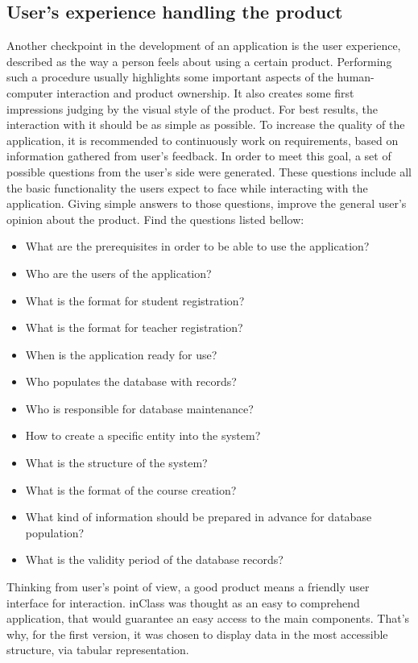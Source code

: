 \subsection{User's experience handling the product}
Another checkpoint in the development of an application is the user experience, described as the way a person feels about using a certain product. Performing such a procedure usually highlights some important aspects of the human-computer interaction and product ownership. It also creates some first impressions judging by the visual style of the product. For best results, the interaction with it should be as simple as possible. To increase the quality of the application, it is recommended to continuously  work on requirements, based on information gathered from user's feedback. In order to meet this goal, a set of possible questions from the user's side were generated. These questions include all the basic functionality the users expect to face while interacting with the application. Giving simple answers to those questions, improve the general user's opinion about the product. Find the questions listed bellow:
\begin{itemize}
\item What are the prerequisites in order to be able to use the application?
\item Who are the users of the application?
\item What is the format for student registration?
\item What is the format for teacher registration?
\item When is the application ready for use?
\item Who populates the database with records?
\item Who is responsible for database maintenance?
\item How to create a specific entity into the system?
\item What is the structure of the system?
\item What is the format of the course creation?
\item What kind of information should be prepared in advance for database population?
\item What is the validity period of the database records?
\end{itemize}

Thinking from user's point of view, a good product means a friendly user interface for interaction. inClass was thought as an easy to comprehend application, that would guarantee an easy access to the main components. That's why, for the first version, it was chosen to display data in the most accessible structure, via tabular representation. 

